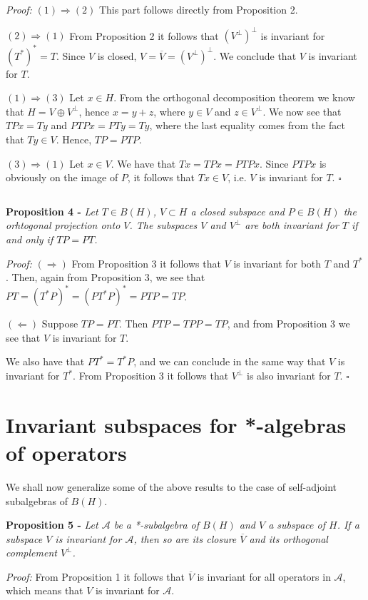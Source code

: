 \documentclass[12pt]{article}
\begin{document}
\emph{Proof:} $(1) \Longrightarrow (2)$ This part follows directly from Proposition 2.

$(2) \Longrightarrow (1)$ From Proposition 2 it follows that $(V^{\perp})^{\perp}$ is invariant for $(T^*)^* = T$. Since $V$ is closed, $V = \overline{V} = (V^{\perp})^{\perp}$. We conclude that $V$ is invariant for $T$.

$(1) \Longrightarrow (3)$ Let $x \in H$. From the orthogonal decomposition theorem we know that $H = V \oplus V^{\perp}$, hence $x = y + z$, where $y \in V$ and $z \in V^{\perp}$. We now see that $TPx = Ty$ and $PTPx = PTy = Ty$, where the last equality comes from the fact that $Ty \in V$. Hence, $TP = PTP$.

$(3) \Longrightarrow (1)$ Let $x \in V$. We have that $Tx = TPx = PTPx$. Since $PTPx$ is obviously on the image of $P$, it follows that $Tx \in V$, i.e. $V$ is invariant for $T$. $\square$

$\,$

{\bf Proposition 4 -} \emph{Let $T \in B(H)$, $V \subset H$ a closed subspace and $P \in B(H)$ the orhtogonal projection onto $V$. The subspaces $V$ and $V^{\perp}$ are both invariant for $T$ if and only if $TP = PT$.}

\emph{Proof:} $(\Longrightarrow)$ From Proposition 3 it follows that $V$ is invariant for both $T$ and $T^*$. Then, again from Proposition 3, we see that $PT = (T^*P)^* = (PT^*P)^*= PTP = TP$.

$(\Longleftarrow)$ Suppose $TP = PT$. Then $PTP = TPP =TP$, and from Proposition 3 we see that $V$ is invariant for $T$.

We also have that $PT^* = T^*P$, and we can conclude in the same way that $V$ is invariant for $T^*$. From Proposition 3 it follows that $V^{\perp}$ is also invariant for $T$. $\square$

\section*{Invariant subspaces for *-algebras of operators}

We shall now generalize some of the above results to the case of self-adjoint subalgebras of $B(H)$.

{\bf Proposition 5 -} \emph{Let $\mathcal{A}$ be a *-subalgebra of $B(H)$ and $V$ a subspace of $H$. If a subspace $V$ is invariant for $\mathcal{A}$, then so are its closure $\overline{V}$ and its orthogonal complement $V^{\perp}$.}

\emph{Proof:} From Proposition 1 it follows that $\overline{V}$ is invariant for all operators in $\mathcal{A}$, which means that $V$ is invariant for $\mathcal{A}$.
\end{document}
